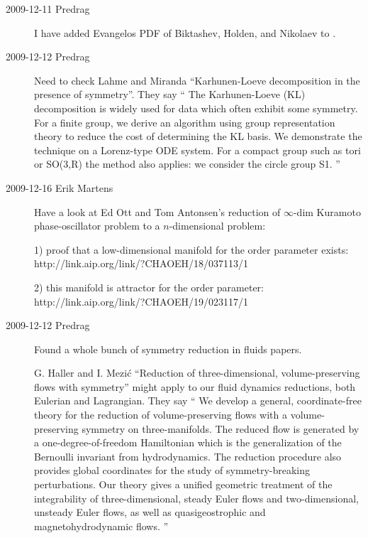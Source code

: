 \begin{description}
\item[2009-12-11 Predrag] I have added Evangelos PDF of
Biktashev, Holden, and Nikolaev to
.

\item[2009-12-12 Predrag] Need to check Lahme and Miranda
``Karhunen-Loeve decomposition in
    the presence of symmetry''. They say
``
The Karhunen-Loeve (KL) decomposition is
  widely used for data which often exhibit some symmetry.
  For a finite group, we derive an
  algorithm using group representation theory to reduce the
  cost of determining the KL basis. We demonstrate the
  technique on a Lorenz-type ODE system. For a compact group
  such as tori or SO(3,R) the method also applies: we
  consider the circle group S1.
''

\item[2009-12-16 Erik Martens] %
Have a look at
Ed Ott and Tom Antonsen's reduction of $\infty$-dim Kuramoto phase-oscillator
problem to a $n$-dimensional problem:

1) proof that a low-dimensional manifold for the order parameter exists:
\\
{http://link.aip.org/link/?CHAOEH/18/037113/1}

2) this manifold is attractor for the order parameter:
\\
{http://link.aip.org/link/?CHAOEH/19/023117/1}


\item[2009-12-12 Predrag] Found a whole bunch of symmetry
reduction in fluids papers.

G. Haller and I. Mezi\'c
``Reduction of three-dimensional, volume-preserving flows
with symmetry''
might apply to our fluid dynamics reductions, both
Eulerian and Lagrangian.
They say ``
We develop a general, coordinate-free theory for the reduction
of volume-preserving flows with a volume-preserving symmetry on
three-manifolds. The reduced flow is generated by a
one-degree-of-freedom Hamiltonian which is the generalization
of the Bernoulli invariant from hydrodynamics. The reduction
procedure also provides global coordinates for the study of
symmetry-breaking perturbations. Our theory gives a unified
geometric treatment of the integrability of three-dimensional,
steady Euler flows and two-dimensional, unsteady Euler flows,
as well as quasigeostrophic and magnetohydrodynamic flows.
''


\end{description}

